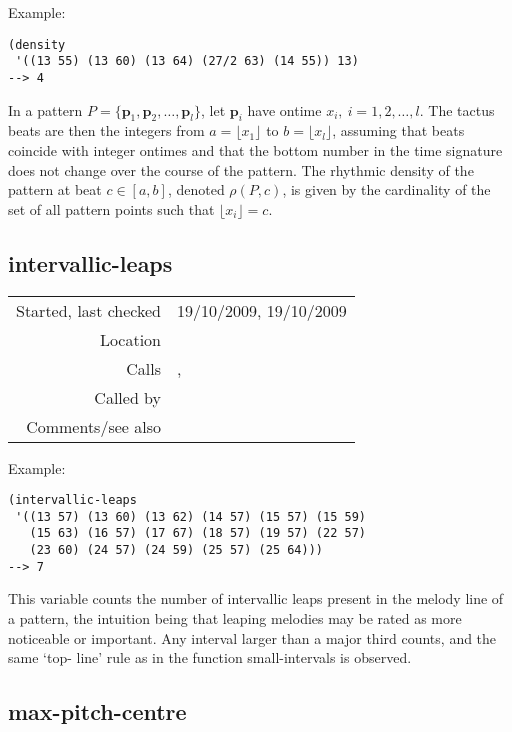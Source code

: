 \vspace{0.5cm}
\noindent Example:
\begin{verbatim}
(density
 '((13 55) (13 60) (13 64) (27/2 63) (14 55)) 13)
--> 4
\end{verbatim}

\noindent In a pattern
$P = \{ \mathbf{p}_1, \mathbf{p}_2,\ldots,
\mathbf{p}_l \}$, let $\mathbf{p}_i$ have ontime
$x_i,\ i = 1, 2,\ldots, l$. The tactus beats are then
the integers from $a = \lfloor x_1\rfloor$ to $b =
\lfloor x_l\rfloor$, assuming that beats coincide with
integer ontimes and that the bottom number in the time
signature does not change over the course of the
pattern. The rhythmic density of the pattern at beat
$c \in [a, b]$, denoted $\rho(P, c)$, is given by the
cardinality of the set of all pattern points such that
$\lfloor x_i\rfloor = c$.


\subsection*{intervallic-leaps}\label{fun:intervallic-leaps}

\vspace{0.3cm}
\begin{tabular}{r|p{8cm}}
Started, last checked & 19/10/2009, 19/10/2009 \\
Location & \nameref{sec:musical-properties} \\
Calls & \nameref{fun:spacing-items}, \nameref{fun:top-line} \\
Called by & \\
Comments/see also & \nameref{fun:small-intervals}
\end{tabular}

\vspace{0.5cm}
\noindent Example:
\begin{verbatim}
(intervallic-leaps
 '((13 57) (13 60) (13 62) (14 57) (15 57) (15 59)
   (15 63) (16 57) (17 67) (18 57) (19 57) (22 57)
   (23 60) (24 57) (24 59) (25 57) (25 64)))
--> 7
\end{verbatim}

\noindent This variable counts the number of
intervallic leaps present in the melody line of a
pattern, the intuition being that leaping melodies may
be rated as more noticeable or important. Any interval
larger than a major third counts, and the same `top-
line' rule as in the function small-intervals is
observed.


\subsection*{max-pitch-centre}\label{fun:max-pitch-centre}

